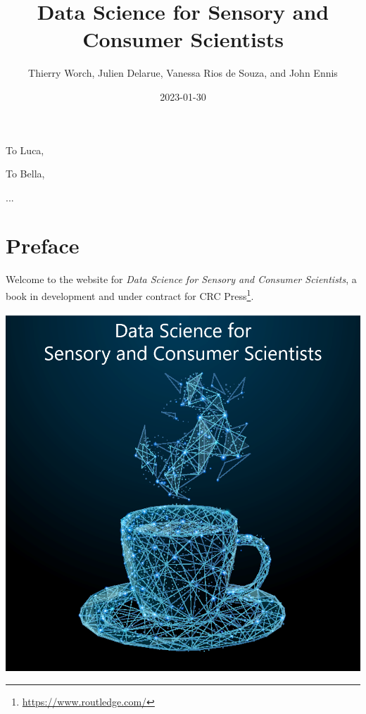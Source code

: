 \documentclass[
]{krantz}
\title{Data Science for Sensory and Consumer Scientists}
\author{Thierry Worch, Julien Delarue, Vanessa Rios de Souza, and John Ennis}
\date{2023-01-30}
\renewcommand{\href}[2]{#2\footnote{\url{#1}}}
\begin{document}
\maketitle


\thispagestyle{empty}

\begin{center}
To Luca,

To Bella,

...
\end{center}

\setlength{\abovedisplayskip}{-5pt}
\setlength{\abovedisplayshortskip}{-5pt}

{
\hypersetup{linkcolor=}
\setcounter{tocdepth}{2}
\tableofcontents
}
\hypertarget{preface}{%
\chapter*{Preface}\label{preface}}


Welcome to the website for \emph{Data Science for Sensory and Consumer Scientists}, a book in development and under contract for \href{https://www.routledge.com/}{CRC Press}.

\includegraphics[width=0.9\linewidth]{images/cover_art}
\end{document}
